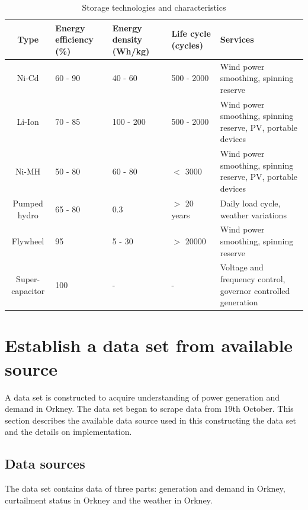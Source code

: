 \documentclass[12pt,a4paper]{report}
\begin{document}
        \begin{table}[ht]
            \begin{tabulary}{\linewidth}{c L L L L}
                \hline
                Type & Energy efficiency (\%) & Energy density (Wh/kg) & Life cycle (cycles) & Services \\ \hline
                \hline
                Ni-Cd & 60 - 90 & 40 - 60 & 500 - 2000 & Wind power smoothing, spinning reserve \\ \hline
                Li-Ion & 70 - 85 & 100 - 200 & 500 - 2000 &  Wind power smoothing, spinning reserve, PV, portable devices\\ \hline
                Ni-MH & 50 - 80 & 60 - 80 & $<$ 3000 & Wind power smoothing, spinning reserve, PV, portable devices \\ \hline
                Pumped hydro & 65 - 80 & 0.3 & $>$ 20 years & Daily load cycle, weather variations \\ \hline
                Flywheel & 95 & 5 - 30 & $>$ 20000 &  Wind power smoothing, spinning reserve \\ \hline
                Super-capacitor & 100 & - & - & Voltage and frequency control, governor controlled generation \\ \hline
            \end{tabulary}
            \caption{Storage technologies and characteristics}
            \label{table_storage_characteristics}
        \end{table}

        \section{Establish a data set from available source}
        A data set is constructed to acquire understanding of power generation and demand in Orkney. The data set began to scrape data from 19th October. 
        This section describes the available data source used in this constructing the data set and the details on implementation.

        \subsection{Data sources}
        The data set contains data of three parts: generation and demand in Orkney, curtailment status in Orkney and the weather in Orkney.
\end{document}
